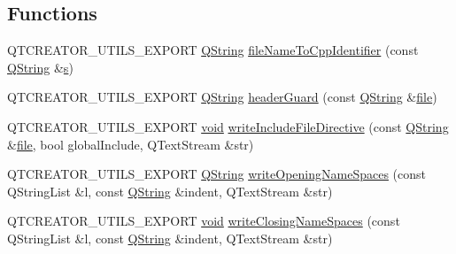 \subsection*{Functions}
\begin{DoxyCompactItemize}
\item 
Q\-T\-C\-R\-E\-A\-T\-O\-R\-\_\-\-U\-T\-I\-L\-S\-\_\-\-E\-X\-P\-O\-R\-T \hyperlink{group___u_a_v_objects_plugin_gab9d252f49c333c94a72f97ce3105a32d}{Q\-String} \hyperlink{namespace_utils_a485be9a92787ac6067d4b6aee9c4d19c}{file\-Name\-To\-Cpp\-Identifier} (const \hyperlink{group___u_a_v_objects_plugin_gab9d252f49c333c94a72f97ce3105a32d}{Q\-String} \&\hyperlink{glext_8h_ad585a1393cfa368fa9dc3d8ebff640d5}{s})
\item 
Q\-T\-C\-R\-E\-A\-T\-O\-R\-\_\-\-U\-T\-I\-L\-S\-\_\-\-E\-X\-P\-O\-R\-T \hyperlink{group___u_a_v_objects_plugin_gab9d252f49c333c94a72f97ce3105a32d}{Q\-String} \hyperlink{namespace_utils_ac52a000b5cec9305f2f39fa16f10b718}{header\-Guard} (const \hyperlink{group___u_a_v_objects_plugin_gab9d252f49c333c94a72f97ce3105a32d}{Q\-String} \&\hyperlink{uavobjecttemplate_8m_a97c04efa65bcf0928abf9260bc5cbf46}{file})
\item 
Q\-T\-C\-R\-E\-A\-T\-O\-R\-\_\-\-U\-T\-I\-L\-S\-\_\-\-E\-X\-P\-O\-R\-T \hyperlink{group___u_a_v_objects_plugin_ga444cf2ff3f0ecbe028adce838d373f5c}{void} \hyperlink{namespace_utils_aa128b664db6245a949180eeb33241e23}{write\-Include\-File\-Directive} (const \hyperlink{group___u_a_v_objects_plugin_gab9d252f49c333c94a72f97ce3105a32d}{Q\-String} \&\hyperlink{uavobjecttemplate_8m_a97c04efa65bcf0928abf9260bc5cbf46}{file}, bool global\-Include, Q\-Text\-Stream \&str)
\item 
Q\-T\-C\-R\-E\-A\-T\-O\-R\-\_\-\-U\-T\-I\-L\-S\-\_\-\-E\-X\-P\-O\-R\-T \hyperlink{group___u_a_v_objects_plugin_gab9d252f49c333c94a72f97ce3105a32d}{Q\-String} \hyperlink{namespace_utils_a4f9bdb87b689309d59ddefa4eb755238}{write\-Opening\-Name\-Spaces} (const Q\-String\-List \&l, const \hyperlink{group___u_a_v_objects_plugin_gab9d252f49c333c94a72f97ce3105a32d}{Q\-String} \&indent, Q\-Text\-Stream \&str)
\item 
Q\-T\-C\-R\-E\-A\-T\-O\-R\-\_\-\-U\-T\-I\-L\-S\-\_\-\-E\-X\-P\-O\-R\-T \hyperlink{group___u_a_v_objects_plugin_ga444cf2ff3f0ecbe028adce838d373f5c}{void} \hyperlink{namespace_utils_ad78c644f74183cea691888f986f111a7}{write\-Closing\-Name\-Spaces} (const Q\-String\-List \&l, const \hyperlink{group___u_a_v_objects_plugin_gab9d252f49c333c94a72f97ce3105a32d}{Q\-String} \&indent, Q\-Text\-Stream \&str)
\item 

\end{DoxyCompactItemize}
